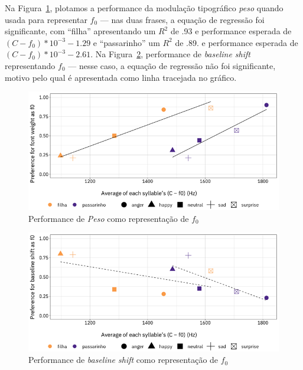 \documentclass[11pt]{article}
\begin{document}
  Na Figura~\ref{fig:font_weight_as_f0}, plotamos a performance da modulação tipográfico {\itshape peso} quando usada para representar $f_0$ --- nas duas frases, a equação de regressão foi significante, com ``filha'' apresentando um $R^2$ de .93 e performance esperada de $(C-f_0) * 10^{-3} - 1.29$ e ``passarinho'' um $R^2$ de .89. e performance esperada de $(C-f_0) * 10^{-3} - 2.61$. Na Figura~\ref{fig:baseline_shift_as_f0}, performance de {\itshape baseline shift} representando $f_0$ --- nesse caso, a equação de regressão não foi significante, motivo pelo qual é apresentada como linha tracejada no gráfico.
  
\begin{figure}[H]
     {\centering
\includegraphics[width=\linewidth]{fig/font_weight_as_pitch.png}
     \caption{Performance de {\itshape Peso} como representação de $f_0$}
     \label{fig:font_weight_as_f0}\par}
\end{figure}

\begin{figure}[H]
     {\centering
\includegraphics[width=\linewidth]{fig/baseline_shift_as_pitch.png}
     \caption{Performance de {\itshape baseline shift} como representação de $f_0$}
     \label{fig:baseline_shift_as_f0}\par}
\end{figure}
\end{document}
